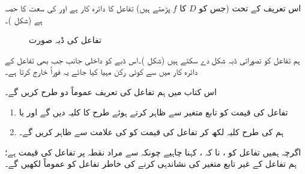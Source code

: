 اس تعریف کے تحت  (جس کو $D$ کا $f$ پڑھتے ہیں) تفاعل  کا دائرہ کار ہے اور  کی سعت  کا حصہ ہے (شکل )۔
\begin{figure}
\centering
\begin{minipage}{0.45\textwidth}
\centering
{}
\caption{سلسلہ $D$ سے سلسلہ $R$ پر تفاعل، $D$ کے ہر رکن کو $R$ کا یکتا رکن مختص کرتا ہے۔}
\label{شکل_ابتدا_تفاعل_دائرہ_کار_اور_سعت}
\end{minipage}\hfill
\begin{minipage}{0.45\textwidth}
\centering
{}
\caption{تفاعل کی ڈبہ صورت}
\label{شکل_ابتدا_تفاعل_ڈبہ}
\end{minipage}%
\end{figure}

ہم تفاعل کو تصوراتی ڈبہ شکل دے سکتے ہیں (شکل )۔اس ڈبے کو داخلی جانب جب بھی تفاعل کے دائرہ کار میں سے کوئی رکن مہیا کیا جائے یہ فوراً  خارج کرتا ہے۔

اس کتاب میں ہم تفاعل کی تعریف عموماً دو طرح کریں گے۔
\begin{enumerate}[1.]
\item
تفاعل کی قیمت کو تابع متغیر  سے ظاہر کرتے ہوئے   طرح کا کلیہ دیں گے اور یا
\item
ہم  کی طرح کلیہ لکھ کر تفاعل کی قیمت کو  کی علامت سے ظاہر کریں گے۔
\end{enumerate}

اگرچہ ہمیں تفاعل کو ، نا کہ ، کہنا چاہیے چونکہ  سے مراد نقطہ  پر تفاعل کی قیمت ہے؛ ہم تفاعل کے  غیر تابع متغیر کی نشاندہی کرنے کی خاطر تفاعل کو عموماً    لکھیں گے۔

